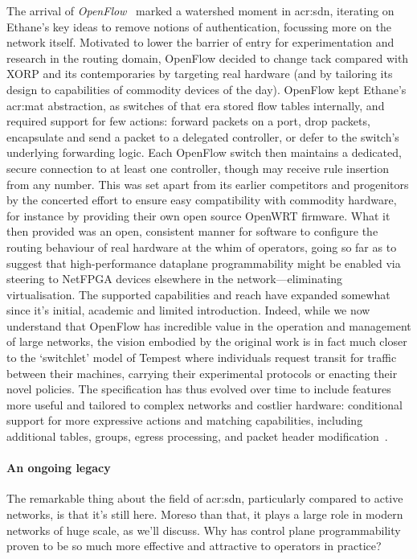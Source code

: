 The arrival of \emph{OpenFlow}~\parencite{DBLP:journals/ccr/McKeownABPPRST08} marked a watershed moment in \gls{acr:sdn}, iterating on Ethane's key ideas to remove notions of authentication, focussing more on the network itself.
Motivated to lower the barrier of entry for experimentation and research in the routing domain, OpenFlow decided to change tack compared with XORP and its contemporaries by targeting real hardware (and by tailoring its design to capabilities of commodity devices of the day).
OpenFlow kept Ethane's \gls{acr:mat} abstraction, as switches of that era stored flow tables internally, and required support for few actions: forward packets on a port, drop packets, encapsulate and send a packet to a delegated controller, or defer to the switch's underlying forwarding logic.
Each OpenFlow switch then maintains a dedicated, secure connection to at least one controller, though may receive rule insertion from any number.
This was set apart from its earlier competitors and progenitors by the concerted effort to ensure easy compatibility with commodity hardware, for instance by providing their own open source OpenWRT firmware.
What it then provided was an open, consistent manner for software to configure the routing behaviour of real hardware at the whim of operators, going so far as to suggest that high-performance dataplane programmability might be enabled via steering to NetFPGA devices elsewhere in the network---eliminating virtualisation.
The supported capabilities and reach have expanded somewhat since it's initial, academic and limited introduction.
Indeed, while we now understand that OpenFlow has incredible value in the operation and management of large networks, the vision embodied by the original work is in fact much closer to the `switchlet' model of Tempest where individuals request transit for traffic between their machines, carrying their experimental protocols or enacting their novel policies.
The specification has thus evolved over time to include features more useful and tailored to complex networks and costlier hardware: conditional support for more expressive actions and matching capabilities, including additional tables, groups, egress processing, and packet header modification~\parencite{openflow-1-5}.

\paragraph{An ongoing legacy}
The remarkable thing about the field of \gls{acr:sdn}, particularly compared to active networks, is that it's still here.
Moreso than that, it plays a large role in modern networks of huge scale, as we'll discuss.
Why has control plane programmability proven to be so much more effective and attractive to operators in practice?

